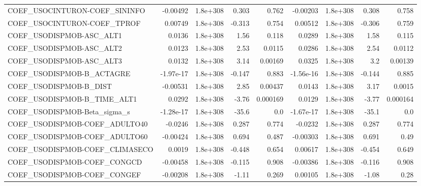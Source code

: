 \begin{tabular}{lrrrrrrrr}
COEF\_USOCINTURON-COEF\_SININFO     &    -0.00492 &     1.8e+308 &     0.303 &    0.762 &   -0.00203 &    1.8e+308 &        0.308 &         0.758 \\
COEF\_USOCINTURON-COEF\_TPROF       &     0.00749 &     1.8e+308 &    -0.313 &    0.754 &    0.00512 &    1.8e+308 &       -0.306 &         0.759 \\
COEF\_USODISPMOB-ASC\_ALT1          &      0.0136 &     1.8e+308 &      1.56 &    0.118 &     0.0289 &    1.8e+308 &         1.58 &         0.115 \\
COEF\_USODISPMOB-ASC\_ALT2          &      0.0123 &     1.8e+308 &      2.53 &   0.0115 &     0.0286 &    1.8e+308 &         2.54 &        0.0112 \\
COEF\_USODISPMOB-ASC\_ALT3          &      0.0132 &     1.8e+308 &      3.14 &  0.00169 &     0.0325 &    1.8e+308 &          3.2 &       0.00139 \\
COEF\_USODISPMOB-B\_ACTAGRE         &   -1.97e-17 &     1.8e+308 &    -0.147 &    0.883 &  -1.56e-16 &    1.8e+308 &       -0.144 &         0.885 \\
COEF\_USODISPMOB-B\_DIST            &    -0.00531 &     1.8e+308 &      2.85 &  0.00437 &     0.0143 &    1.8e+308 &         3.17 &        0.0015 \\
COEF\_USODISPMOB-B\_TIME\_ALT1       &      0.0292 &     1.8e+308 &     -3.76 & 0.000169 &     0.0129 &    1.8e+308 &        -3.77 &      0.000164 \\
COEF\_USODISPMOB-Beta\_sigma\_s      &   -1.28e-17 &     1.8e+308 &     -35.6 &      0.0 &  -1.67e-17 &    1.8e+308 &        -35.1 &           0.0 \\
COEF\_USODISPMOB-COEF\_ADULTO40     &     -0.0246 &     1.8e+308 &     0.287 &    0.774 &    -0.0232 &    1.8e+308 &        0.287 &         0.774 \\
COEF\_USODISPMOB-COEF\_ADULTO60     &    -0.00424 &     1.8e+308 &     0.694 &    0.487 &   -0.00303 &    1.8e+308 &        0.691 &          0.49 \\
COEF\_USODISPMOB-COEF\_CLIMASECO    &      0.0019 &     1.8e+308 &    -0.448 &    0.654 &    0.00617 &    1.8e+308 &       -0.454 &         0.649 \\
COEF\_USODISPMOB-COEF\_CONGCD       &    -0.00458 &     1.8e+308 &    -0.115 &    0.908 &   -0.00386 &    1.8e+308 &       -0.116 &         0.908 \\
COEF\_USODISPMOB-COEF\_CONGEF       &    -0.00208 &     1.8e+308 &     -1.11 &    0.269 &    0.00105 &    1.8e+308 &        -1.08 &          0.28 \\

\end{tabular}

